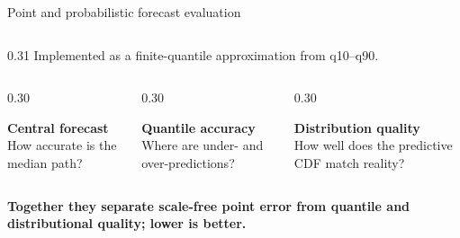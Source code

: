 \documentclass[aspectratio=169,10pt]{beamer}
\begin{document}
\begin{frame}{Point and probabilistic forecast evaluation}
\begin{columns}[T,totalwidth=0.97\linewidth]
\begin{column}{0.31\linewidth}
      \vspace{0.13cm}
      Implemented as a finite-quantile approximation from q10--q90.
    \end{column}
  \end{columns}

  \vspace{0.34cm}
  \begin{columns}[T,totalwidth=0.92\linewidth]
    \begin{column}{0.30\linewidth}
      \centering\scriptsize
      \colorbox{TealLight}{\parbox{0.90\linewidth}{\centering
        \textbf{Central forecast}\\How accurate is the median path?}}
    \end{column}
    \begin{column}{0.30\linewidth}
      \centering\scriptsize
      \colorbox{GoldLight}{\parbox{0.90\linewidth}{\centering
        \textbf{Quantile accuracy}\\Where are under- and over-predictions?}}
    \end{column}
    \begin{column}{0.30\linewidth}
      \centering\scriptsize
      \colorbox{PurpleLight}{\parbox{0.90\linewidth}{\centering
        \textbf{Distribution quality}\\How well does the predictive CDF match reality?}}
    \end{column}
  \end{columns}

  \vspace{0.22cm}
  \begin{center}\small\textbf{Together they separate scale-free point error from
  quantile and distributional quality; lower is better.}\end{center}
\end{frame}
\end{document}
